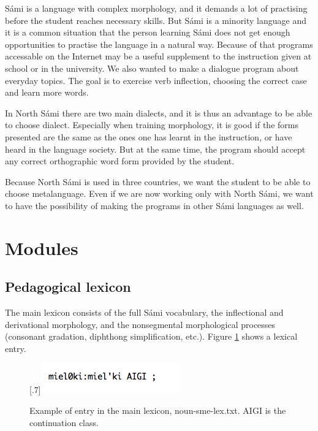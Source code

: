 \documentclass[a4paper,12pt]{article}
\begin{document}
Sámi is a language with complex morphology, and it demands a lot of practising before the student reaches necessary skills. But Sámi is a minority language and it is a common situation that the person learning Sámi does not get enough opportunities to practise the language in a natural way. Because of that programs accessable on the Internet may be a useful supplement to the instruction given at school or in the university. We also wanted to make a dialogue program about everyday topics. The goal is to exercise verb inflection, choosing the correct case and learn more words. 

In North Sámi there are two main dialects, and it is thus an advantage to be able to choose dialect. Especially when training morphology, it is good if the forms presented are the same as the ones one has learnt in the instruction, or have heard in the language society. But at the same time, the program should accept any correct orthographic word form provided by the student.

Because North Sámi is used in three countries, we want the student to be able to choose metalanguage. Even if we are now working only with North Sámi, we want to have the possibility of making the programs in other Sámi languages as well.



\section{Modules}

\subsection{Pedagogical lexicon}

The main lexicon consists of the full Sámi vocabulary, the inflectional and derivational morphology, and the nonsegmental morphological processes (consonant gradation, diphthong simplification, etc.). Figure \ref{nounsmelex} shows a lexical entry.\\


\begin{figure}[htbp]
\begin{center}
\scalebox{.7}[.7]{\includegraphics{img/noun-sme-lex.png}}\\
\caption{Example of entry in the main lexicon, noun-sme-lex.txt. AIGI is the continuation class.}
\label{nounsmelex}
\end{center}
\end{figure}
\end{document}
